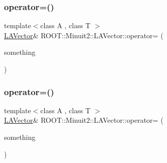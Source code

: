 \subsubsection{\texorpdfstring{operator=()}{operator=()}\hspace{0.1cm}{\footnotesize\ttfamily [5/14]}}
{\footnotesize\ttfamily template$<$class A , class T $>$ \\
\mbox{\hyperlink{classROOT_1_1Minuit2_1_1LAVector}{L\+A\+Vector}}\& R\+O\+O\+T\+::\+Minuit2\+::\+L\+A\+Vector\+::operator= (\begin{DoxyParamCaption}\item[{const \mbox{\hyperlink{classROOT_1_1Minuit2_1_1ABObj}{A\+B\+Obj}}$<$ \mbox{\hyperlink{classROOT_1_1Minuit2_1_1vec}{vec}}, \mbox{\hyperlink{classROOT_1_1Minuit2_1_1ABObj}{A\+B\+Obj}}$<$ \mbox{\hyperlink{classROOT_1_1Minuit2_1_1vec}{vec}}, A, T $>$, T $>$ \&}]{something }\end{DoxyParamCaption})\hspace{0.3cm}{\ttfamily [inline]}}

\mbox{\label{classROOT_1_1Minuit2_1_1LAVector_a968511a119769ea707df72b17fc044c9}} 
\subsubsection{\texorpdfstring{operator=()}{operator=()}\hspace{0.1cm}{\footnotesize\ttfamily [6/14]}}
{\footnotesize\ttfamily template$<$class A , class T $>$ \\
\mbox{\hyperlink{classROOT_1_1Minuit2_1_1LAVector}{L\+A\+Vector}}\& R\+O\+O\+T\+::\+Minuit2\+::\+L\+A\+Vector\+::operator= (\begin{DoxyParamCaption}\item[{const \mbox{\hyperlink{classROOT_1_1Minuit2_1_1ABObj}{A\+B\+Obj}}$<$ \mbox{\hyperlink{classROOT_1_1Minuit2_1_1vec}{vec}}, \mbox{\hyperlink{classROOT_1_1Minuit2_1_1ABObj}{A\+B\+Obj}}$<$ \mbox{\hyperlink{classROOT_1_1Minuit2_1_1vec}{vec}}, A, T $>$, T $>$ \&}]{something }\end{DoxyParamCaption})\hspace{0.3cm}{\ttfamily [inline]}}

\mbox{\label{classROOT_1_1Minuit2_1_1LAVector_a9ecf0f7d6cfc259fe0bb4589a060d7a3}} 
